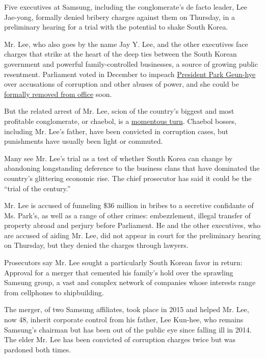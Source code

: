 Five executives at Samsung, including the conglomerate's de facto
leader, Lee Jae-yong, formally denied bribery charges against them on
Thursday, in a preliminary hearing for a trial with the potential to
shake South Korea.

Mr. Lee, who also goes by the name Jay Y. Lee, and the other executives
face charges that strike at the heart of the deep ties between the South
Korean government and powerful family-controlled businesses, a source of
growing public resentment. Parliament voted in December to impeach
\href{https://www.nytimes.com/2016/12/09/world/asia/south-korea-president-park-geun-hye-impeached.html}{President
Park Geun-hye} over accusations of corruption and other abuses of power,
and she could be
\href{https://www.nytimes.com/2017/03/08/world/asia/south-korea-president-impeach-park-geun-hye.html?rref=collection\%2Ftimestopic\%2FPark\%20Geun-hye\&action=click\&contentCollection=timestopics\&region=stream\&module=stream_unit\&version=latest\&contentPlacement=2\&pgtype=collection}{formally
removed from office} soon.

But the related arrest of Mr. Lee, scion of the country's biggest and
most profitable conglomerate, or chaebol, is a
\href{https://www.nytimes.com/2017/03/04/business/south-korea-samsung-bribery-lee.html}{momentous
turn}. Chaebol bosses, including Mr. Lee's father, have been convicted
in corruption cases, but punishments have usually been light or
commuted.

Many see Mr. Lee's trial as a test of whether South Korea can change by
abandoning longstanding deference to the business clans that have
dominated the country's glittering economic rise. The chief prosecutor
has said it could be the ``trial of the century.''

Mr. Lee is accused of funneling \$36 million in bribes to a secretive
confidante of Ms. Park's, as well as a range of other crimes:
embezzlement, illegal transfer of property abroad and perjury before
Parliament. He and the other executives, who are accused of aiding Mr.
Lee, did not appear in court for the preliminary hearing on Thursday,
but they denied the charges through lawyers.

Prosecutors say Mr. Lee sought a particularly South Korean favor in
return: Approval for a merger that cemented his family's hold over the
sprawling Samsung group, a vast and complex network of companies whose
interests range from cellphones to shipbuilding.

The merger, of two Samsung affiliates, took place in 2015 and helped Mr.
Lee, now 48, inherit corporate control from his father, Lee Kun-hee, who
remains Samsung's chairman but has been out of the public eye since
falling ill in 2014. The elder Mr. Lee has been convicted of corruption
charges twice but was pardoned both times.

